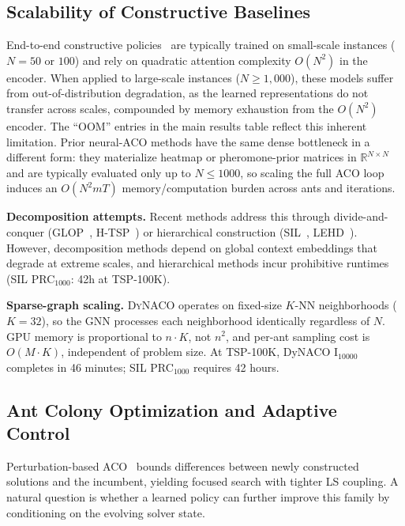 \documentclass[sigconf,nonacm]{acmart}
\newcommand{\DyNACO}{\textsc{DyNACO}}
\begin{document}
\subsection{Scalability of Constructive Baselines}
\label{app:constructive-limits}

End-to-end constructive policies~\cite{attentionmodel,pomo,bq,lehd, invit, sigd} are typically trained on small-scale instances ($N{=}50$ or $100$) and rely on quadratic attention complexity $O(N^2)$ in the encoder.
When applied to large-scale instances ($N{\geq}1{,}000$), these models suffer from out-of-distribution degradation, as the learned representations do not transfer across scales, compounded by memory exhaustion from the $O(N^2)$ encoder.
The ``OOM'' entries in the main results table reflect this inherent limitation.
Prior neural-ACO methods have the same dense bottleneck in a different form: they materialize heatmap or pheromone-prior matrices in $\mathbb{R}^{N\times N}$ and are typically evaluated only up to $N{\leq}1000$, so scaling the full ACO loop induces an $O(N^2 m T)$ memory/computation burden across ants and iterations.

\textbf{Decomposition attempts.}
Recent methods address this through divide-and-conquer (GLOP~\cite{glop}, H-TSP~\cite{htsp}) or hierarchical construction (SIL~\cite{sil}, LEHD~\cite{lehd}).
However, decomposition methods depend on global context embeddings that degrade at extreme scales, and hierarchical methods incur prohibitive runtimes (SIL PRC$_{1000}$: 42h at TSP-100K).

\textbf{Sparse-graph scaling.}
\DyNACO{} operates on fixed-size $K$-NN neighborhoods ($K{=}32$), so the GNN processes each neighborhood identically regardless of $N$.
GPU memory is proportional to $n \cdot K$, not $n^2$, and per-ant sampling cost is $O(M \cdot K)$, independent of problem size.
At TSP-100K, DyNACO I$_{10000}$ completes in 46 minutes; SIL PRC$_{1000}$ requires 42 hours.

\subsection{Ant Colony Optimization and Adaptive Control}
\label{app:aco-background}

Perturbation-based ACO~\cite{partialACO, P-ACO, faco} bounds differences between newly constructed solutions and the incumbent, yielding focused search with tighter LS coupling.
A natural question is whether a learned policy can further improve this family by conditioning on the evolving solver state.
\end{document}
